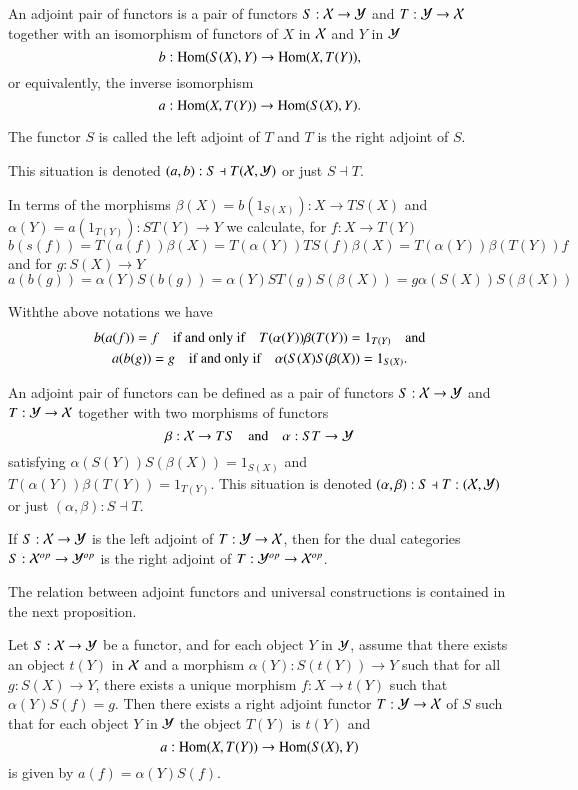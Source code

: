 \begin{definition}\label{chap2-defi1.2}
An adjoint pair of functors is a pair of functors $S:\mathcal{X}\to \mathcal{Y}$ and
$T:\mathcal{Y}\to \mathcal{X}$ together with an isomorphism of functors of $X$ in $\mathcal{X}$
and $Y$ in $\mathcal{Y}$
$$
b:\operatorname{Hom}(S(X),Y)\to \operatorname{Hom}(X,T(Y)),
$$
or equivalently, the inverse isomorphism
$$
a:\operatorname{Hom}(X,T(Y))\to \operatorname{Hom}(S(X),Y).
$$

The functor $S$ is called the left adjoint of $T$ and $T$ is the right
adjoint of $S$.

This situation is denoted $(a,b):S\dashv T(\mathcal{X},\mathcal{Y})$ or just $S\dashv
T$.

In terms of the morphisms $\beta(X)=b(1_{S(X)}):X\to TS(X)$ and
$\alpha(Y)=a(1_{T(Y)}):ST(Y)\to Y$ we calculate, for $f:X\to T(Y)$
$$
b(s(f))=T(a(f))\beta(X)=T(\alpha(Y))TS(f)\beta(X)=T(\alpha(Y))\beta(T(Y))f 
$$
and for $g:S(X)\to Y$
$$
a(b(g))=\alpha(Y)S(b(g))=\alpha(Y)ST(g)S(\beta(X))=g\alpha(S(X))S(\beta(X))
$$
\end{definition}

\begin{remark}\label{chap2-rem1.3}
With\pageoriginale the above notations we have
\begin{gather*}
b(a(f))=f\quad\text{if and only if}\quad
T(\alpha(Y))\beta(T(Y))=1_{T(Y)}\quad\text{and}\\
a(b(g))=g\quad\text{if and only if}\quad \alpha(S(X)S(\beta(X))=1_{S(X)}.
\end{gather*}

An adjoint pair of functors can be defined as a pair of functors
$S:\mathcal{X}\to \mathcal{Y}$ and $T:\mathcal{Y}\to \mathcal{X}$ together with two morphisms of functors
$$
\beta:\mathcal{X}\to TS\quad\text{and}\quad \alpha:ST\to \mathcal{Y}
$$
satisfying $\alpha(S(Y))S(\beta(X))=1_{S(X)}$ and
$T(\alpha(Y))\beta(T(Y))=1_{T(Y)}$. This situation is denoted
$(\alpha,\beta):S\dashv T:(\mathcal{X},\mathcal{Y})$ or just $(\alpha,\beta):S\dashv T$.
\end{remark}

\begin{remark}\label{chap2-rem1.4}
If $S:\mathcal{X}\to \mathcal{Y}$ is the left adjoint of $T:\mathcal{Y}\to \mathcal{X}$, then for the dual
categories $S:\mathcal{X}^{op}\to \mathcal{Y}^{op}$ is the right adjoint of
$T:\mathcal{Y}^{op}\to \mathcal{X}^{op}$. 
\end{remark}

The relation between adjoint functors and universal constructions is
contained in the next proposition.

\begin{proposition}\label{chap2-prop1.5}
Let $S:\mathcal{X}\to \mathcal{Y}$ be a functor, and for each object $Y$ in $\mathcal{Y}$, assume
that there exists an object $t(Y)$ in $\mathcal{X}$ and a morphism
$\alpha(Y):S(t(Y))\to Y$ such that for all $g:S(X)\to Y$, there exists
a unique morphism $f:X\to t(Y)$ such that $\alpha(Y)S(f)=g$. Then
there exists a right adjoint functor $T:\mathcal{Y}\to \mathcal{X}$ of $S$ such that for
each object $Y$ in $\mathcal{Y}$ the object $T(Y)$ is $t(Y)$ and
$$
a:\operatorname{Hom}(X,T(Y))\to \operatorname{Hom}(S(X),Y)
$$
is given by $a(f)=\alpha(Y)S(f)$.
\end{proposition}

